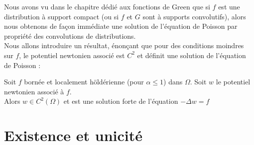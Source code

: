 Nous avons vu dans le chapitre dédié aux fonctions de Green que si $f$ est une distribution à support compact (ou si $f$ et $G$ sont à supports convolutifs), alors nous obtenons de façon immédiate une solution de l'équation de Poisson par propriété des convolutions de distributions.\\
Nous allons introduire un résultat, énonçant que pour des conditions moindres sur $f$, le potentiel newtonien associé est $C^2$ et définit une solution de l'équation de Poisson \cite{Elliptic} :
\begin{lemmabox}
    \begin{lemma}
        Soit $f$ bornée et localement höldérienne (pour $\alpha \leq 1$) dans $\Omega$. Soit $w$ le potentiel newtonien associé à $f$.\\
        Alors $w \in C^2(\Omega)$ et est une solution forte de l'équation $-\Delta w = f$
    \end{lemma}
\end{lemmabox}













\section{Existence et unicité}

